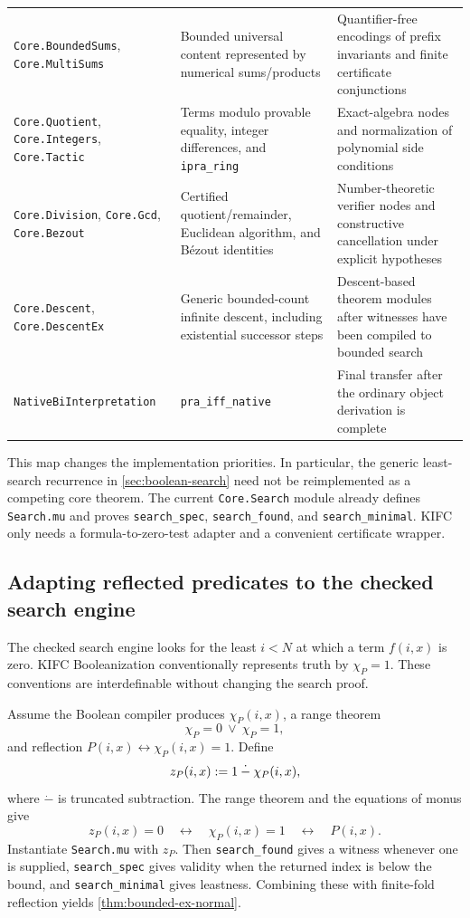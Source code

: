 \begin{longtable}{@{}>{\raggedright\arraybackslash}p{}>{\raggedright\arraybackslash}p{}>{\raggedright\arraybackslash}p{}@{}}
\texttt{Core.BoundedSums}, \texttt{Core.MultiSums} & Bounded universal content represented by numerical sums/products & Quantifier-free encodings of prefix invariants and finite certificate conjunctions \\
\texttt{Core.Quotient}, \texttt{Core.Integers}, \texttt{Core.Tactic} & Terms modulo provable equality, integer differences, and \texttt{ipra\_ring} & Exact-algebra nodes and normalization of polynomial side conditions \\
\texttt{Core.Division}, \texttt{Core.Gcd}, \texttt{Core.Bezout} & Certified quotient/remainder, Euclidean algorithm, and B\'ezout identities & Number-theoretic verifier nodes and constructive cancellation under explicit hypotheses \\
\texttt{Core.Descent}, \texttt{Core.DescentEx} & Generic bounded-count infinite descent, including existential successor steps & Descent-based theorem modules after witnesses have been compiled to bounded search \\
\texttt{NativeBiInterpretation} & \texttt{pra\_iff\_native} & Final transfer after the ordinary object derivation is complete \\
\bottomrule
\end{longtable}

This map changes the implementation priorities.  In particular, the generic least-search recurrence in \cref{sec:boolean-search} need not be reimplemented as a competing core theorem.  The current \texttt{Core.Search} module already defines \texttt{Search.mu} and proves \texttt{search\_spec}, \texttt{search\_found}, and \texttt{search\_minimal}.  KIFC only needs a formula-to-zero-test adapter and a convenient certificate wrapper.

\subsection{Adapting reflected predicates to the checked search engine}

The checked search engine looks for the least \(i<N\) at which a term \(f(i,x)\) is zero.  KIFC Booleanization conventionally represents truth by \(\chi_P=1\).  These conventions are interdefinable without changing the search proof.

Assume the Boolean compiler produces \(\chi_P(i,x)\), a range theorem
\[
  \chi_P=0\ \vee\ \chi_P=1,
\]
and reflection \(P(i,x)\leftrightarrow \chi_P(i,x)=1\).  Define
\[
  z_P(i,x)\mathrel{:=} 1\mathbin{\dot-}\chi_P(i,x),
\]
where \(\dot-\) is truncated subtraction.  The range theorem and the equations of monus give
\[
 z_P(i,x)=0\quad\leftrightarrow\quad \chi_P(i,x)=1
 \quad\leftrightarrow\quad P(i,x).
\]
Instantiate \texttt{Search.mu} with \(z_P\).  Then \texttt{search\_found} gives a witness whenever one is supplied, \texttt{search\_spec} gives validity when the returned index is below the bound, and \texttt{search\_minimal} gives leastness.  Combining these with finite-fold reflection yields \cref{thm:bounded-ex-normal}.

